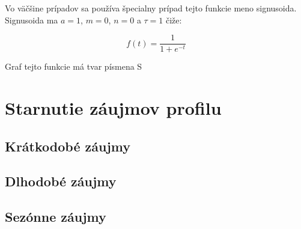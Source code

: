 Vo väčšine prípadov sa používa špecialny prípad tejto funkcie meno signusoida.
Signusoida ma $a = 1$, $m = 0$, $n = 0$ a $\tau = 1$ čiže:

\[f(t) = \frac{1}{1 + e^{-t}}\]

Graf tejto funkcie má tvar písmena S


\section{Starnutie záujmov profilu}

\subsection{Krátkodobé záujmy}

\subsection{Dlhodobé záujmy}

\subsection{Sezónne záujmy}
